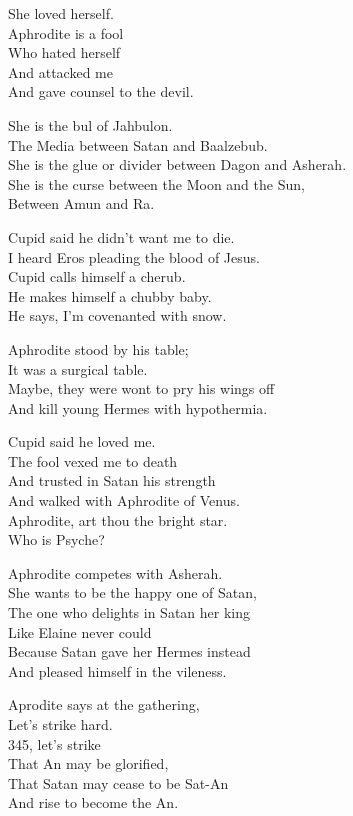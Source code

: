 \documentclass[
]{book}
\begin{document}
She loved herself.\\
Aphrodite is a fool\\
Who hated herself\\
And attacked me\\
And gave counsel to the devil.

She is the bul of Jahbulon.\\
The Media between Satan and Baalzebub.\\
She is the glue or divider between Dagon and Asherah.\\
She is the curse between the Moon and the Sun,\\
Between Amun and Ra.

Cupid said he didn't want me to die.\\
I heard Eros pleading the blood of Jesus.\\
Cupid calls himself a cherub.\\
He makes himself a chubby baby.\\
He says, I'm covenanted with snow.

Aphrodite stood by his table;\\
It was a surgical table.\\
Maybe, they were wont to pry his wings off\\
And kill young Hermes with hypothermia.

Cupid said he loved me.\\
The fool vexed me to death\\
And trusted in Satan his strength\\
And walked with Aphrodite of Venus.\\
Aphrodite, art thou the bright star.\\
Who is Psyche?

Aphrodite competes with Asherah.\\
She wants to be the happy one of Satan,\\
The one who delights in Satan her king\\
Like Elaine never could\\
Because Satan gave her Hermes instead\\
And pleased himself in the vileness.

Aprodite says at the gathering,\\
Let's strike hard.\\
345, let's strike\\
That An may be glorified,\\
That Satan may cease to be Sat-An\\
And rise to become the An.
\end{document}

